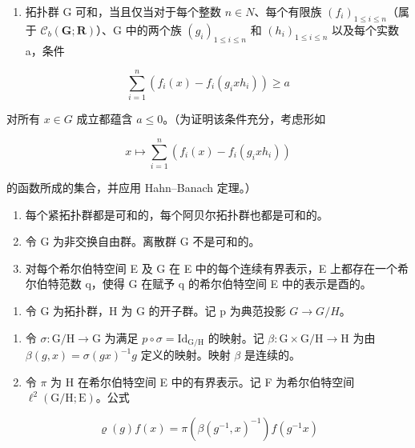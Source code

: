 \begin{enumerate}
\def\labelenumi{\alph{enumi})}
\tightlist
\item
  拓扑群 G 可和，当且仅当对于每个整数 \(n \in N\)、每个有限族 \((f_i)_{1 \leqslant i \leqslant n}\)（属于 \(\mathcal{C}_b(\mathbf{G}; \mathbf{R})\)）、G 中的两个族 \((g_i)_{1 \leqslant i \leqslant n}\) 和 \((h_i)_{1 \leqslant i \leqslant n}\) 以及每个实数 a，条件
\end{enumerate}

\[
\sum_ {i = 1} ^ {n} (f _ {i} (x) - f _ {i} (g _ {i} x h _ {i})) \geqslant a
\]

对所有 \(x \in G\) 成立都蕴含 \(a \leqslant 0\)。（为证明该条件充分，考虑形如

\[
x \mapsto \sum_ {i = 1} ^ {n} (f _ {i} (x) - f _ {i} (g _ {i} x h _ {i}))
\]

的函数所成的集合，并应用 Hahn--Banach 定理。）

\begin{enumerate}
\def\labelenumi{\alph{enumi})}
\setcounter{enumi}{1}
\item
  每个紧拓扑群都是可和的，每个阿贝尔拓扑群也都是可和的。
\item
  令 G 为非交换自由群。离散群 G 不是可和的。
\item
  对每个希尔伯特空间 E 及 G 在 E 中的每个连续有界表示，E 上都存在一个希尔伯特范数 q，使得 G 在赋予 q 的希尔伯特空间 E 中的表示是酉的。
\end{enumerate}

\begin{enumerate}
\def\labelenumi{\arabic{enumi})}
\setcounter{enumi}{4}
\tightlist
\item
  令 G 为拓扑群，H 为 G 的开子群。记 p 为典范投影 \(G \rightarrow G/H\)。
\end{enumerate}

\begin{enumerate}
\def\labelenumi{\alph{enumi})}
\item
  令 \(\sigma\colon\mathrm{G/H}\to\mathrm{G}\) 为满足 \(p\circ\sigma=\mathrm{Id}_{\mathrm{G/H}}\) 的映射。记 \(\beta\colon\mathrm{G}\times\mathrm{G/H}\to\mathrm{H}\) 为由 \(\beta(g,x)=\sigma(gx)^{-1}g\) 定义的映射。映射 \(\beta\) 是连续的。
\item
  令 \(\pi\) 为 H 在希尔伯特空间 E 中的有界表示。记 F 为希尔伯特空间 \(\ell^2 (\mathrm{G / H};\mathrm{E})\)。公式
\end{enumerate}

\[
\varrho (g) f (x) = \pi (\beta (g ^ {- 1}, x) ^ {- 1}) f (g ^ {- 1} x)
\]

